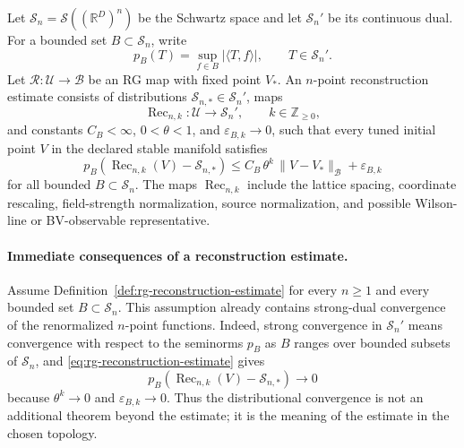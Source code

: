\begin{definition}
\label{def:rg-reconstruction-estimate}
Let \(\mathcal S_n=\mathcal S((\mathbb R^D)^n)\) be the Schwartz space and
let \(\mathcal S_n'\) be its continuous dual.  For a bounded set
\(B\subset\mathcal S_n\), write
\[
  p_B(T)=\sup_{f\in B}|\langle T,f\rangle|,
  \qquad T\in\mathcal S_n' .
\]
Let \(\mathcal R:\mathcal U\to\mathcal B\) be an RG map with fixed point
\(V_\ast\).  An \(n\)-point reconstruction estimate consists of distributions
\(\mathcal S_{n,\ast}\in\mathcal S_n'\), maps
\begin{equation}
  \operatorname{Rec}_{n,k}:\mathcal U\longrightarrow\mathcal S_n',
  \qquad k\in\mathbb Z_{\geq0},
  \label{eq:rg-reconstruction-map}
  \end{equation}
and constants \(C_B<\infty\), \(0<\theta<1\), and
\(\varepsilon_{B,k}\to0\), such that every tuned initial point \(V\) in the
declared stable manifold satisfies
\begin{equation}
  p_B\!\left(
    \operatorname{Rec}_{n,k}(V)-\mathcal S_{n,\ast}
  \right)
  \leq
  C_B\,\theta^k\,\|V-V_\ast\|_{\mathcal B}
  +\varepsilon_{B,k}
  \label{eq:rg-reconstruction-estimate}
\end{equation}
for all bounded \(B\subset\mathcal S_n\).  The maps
\(\operatorname{Rec}_{n,k}\) include the lattice spacing, coordinate
rescaling, field-strength normalization, source normalization, and possible
Wilson-line or BV-observable representative.
\end{definition}

\paragraph{Immediate consequences of a reconstruction estimate.}
Assume Definition~\ref{def:rg-reconstruction-estimate} for every
\(n\geq1\) and every bounded set \(B\subset\mathcal S_n\).  This assumption
already contains strong-dual convergence of the renormalized \(n\)-point
functions.  Indeed, strong convergence in \(\mathcal S_n'\) means convergence
with respect to the seminorms \(p_B\) as \(B\) ranges over bounded subsets of
\(\mathcal S_n\), and \eqref{eq:rg-reconstruction-estimate} gives
\[
  p_B(\operatorname{Rec}_{n,k}(V)-\mathcal S_{n,\ast})\longrightarrow0
\]
because \(\theta^k\to0\) and \(\varepsilon_{B,k}\to0\).  Thus the
distributional convergence is not an additional theorem beyond the estimate;
it is the meaning of the estimate in the chosen topology.

